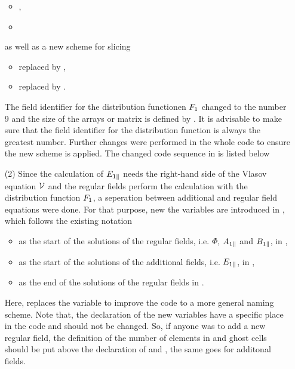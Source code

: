 \begin{enumerate}
\begin{itemize}
        \item {}, 
        \item {}
    \end{itemize}
    as well as a new scheme for slicing
    \begin{itemize}
        \item {} replaced by , 
        \item {} replaced by .
    \end{itemize}
    The field identifier for the distribution functionen $F_1$ changed to the number 9 and the size of the arrays or matrix is defined by . It is advisable to make sure that the field identifier for the distribution function is always the greatest number. Further changes were performed in the whole code to ensure the new scheme is applied. The changed code sequence in  is listed below
    \item[(2)] Since the calculation of $E_{1\parallel}$ needs the right-hand side of the Vlasov equation $\mathcal{V}$ and the regular fields perform the calculation with the distribution function $F_1$, a seperation between additional and regular field equations were done. For that purpose, new the variables are introduced in , which follows the existing notation 
    \begin{itemize}
        \item {} as the start of the solutions of the regular fields, i.e. $\Phi$, $A_{1\parallel}$ and $B_{1\parallel}$, in ,
        \item {} as the start of the solutions of the additional fields, i.e. $E_{1\parallel}$, in ,
        \item {} as the end of the solutions of the regular fields in .
    \end{itemize}
    Here,  replaces the variable  to improve the code to a more general naming scheme. Note that, the declaration of the new variables have a specific place in the code and should not be changed. So, if anyone was to add a new regular field, the definition of the number of elements in  and ghost cells should be put above the declaration of  and , the same goes for additonal fields. 


\end{enumerate}
